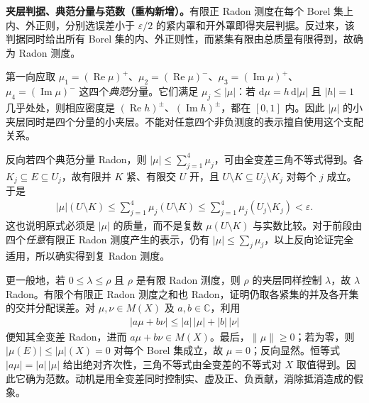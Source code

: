 \documentclass[../../main.tex]{subfiles}
\begin{document}
\begin{remark}
\textbf{夹层判据、典范分量与范数（重构新增）。}有限正 Radon 测度在每个 Borel 集上内、外正则，分别选误差小于 $\varepsilon/2$ 的紧内罩和开外罩即得夹层判据。反过来，该判据同时给出所有 Borel 集的内、外正则性，而紧集有限由总质量有限得到，故确为 Radon 测度。

第一向应取 $\mu_1=(\operatorname{Re}\mu)^+$、$\mu_2=(\operatorname{Re}\mu)^-$、$\mu_3=(\operatorname{Im}\mu)^+$、$\mu_4=(\operatorname{Im}\mu)^-$ 这四个\emph{典范}分量。它们满足 $\mu_j\leqslant|\mu|$：若 $\mathrm d\mu=h\,\mathrm d|\mu|$ 且 $|h|=1$ 几乎处处，则相应密度是 $(\operatorname{Re}h)^\pm$、$(\operatorname{Im}h)^\pm$，都在 $[0,1]$ 内。因此 $|\mu|$ 的小夹层同时是四个分量的小夹层。不能对任意四个非负测度的表示擅自使用这个支配关系。

反向若四个典范分量 Radon，则 $|\mu|\leqslant\sum_{j=1}^4\mu_j$，可由全变差三角不等式得到。各 $K_j\subseteq E\subseteq U_j$，故有限并 $K$ 紧、有限交 $U$ 开，且 $U\setminus K\subseteq U_j\setminus K_j$ 对每个 $j$ 成立。于是
\begin{align*}
|\mu|(U\setminus K)\leqslant\sum_{j=1}^4\mu_j(U\setminus K)
\leqslant\sum_{j=1}^4\mu_j(U_j\setminus K_j)<\varepsilon.
\end{align*}
这也说明原式必须是 $|\mu|$ 的质量，而不是复数 $\mu(U\setminus K)$ 与实数比较。对于前段由四个\emph{任意}有限正 Radon 测度产生的表示，仍有 $|\mu|\leqslant\sum_j\mu_j$，以上反向论证完全适用，所以确实得到复 Radon 测度。

更一般地，若 $0\leqslant\lambda\leqslant\rho$ 且 $\rho$ 是有限 Radon 测度，则 $\rho$ 的夹层同样控制 $\lambda$，故 $\lambda$ Radon。有限个有限正 Radon 测度之和也 Radon，证明仍取各紧集的并及各开集的交并分配误差。对 $\mu,\nu\in M(X)$ 及 $a,b\in\mathbb C$，利用
\begin{align*}
|a\mu+b\nu|\leqslant|a|\,|\mu|+|b|\,|\nu|
\end{align*}
便知其全变差 Radon，进而 $a\mu+b\nu\in M(X)$。最后，$\|\mu\|\geqslant0$；若为零，则 $|\mu(E)|\leqslant|\mu|(X)=0$ 对每个 Borel 集成立，故 $\mu=0$；反向显然。恒等式 $|a\mu|=|a|\,|\mu|$ 给出绝对齐次性，三角不等式由全变差的不等式对 $X$ 取值得到。因此它确为范数。动机是用全变差同时控制实、虚及正、负贡献，消除抵消造成的假象。
\end{remark}

\end{document}
